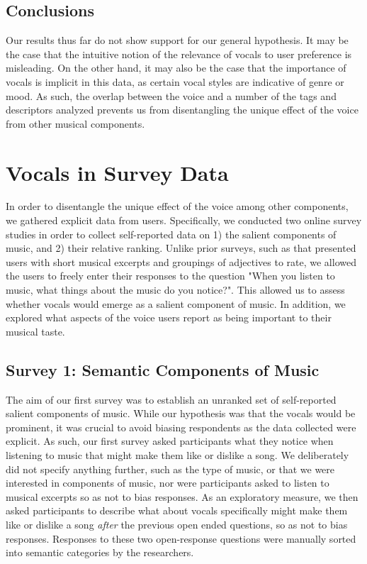 \documentclass{article}
\begin{document}
\subsection{Conclusions}

Our results thus far do not show support for our general hypothesis. It may be the case that the intuitive notion of the relevance of vocals to user preference is misleading. On the other hand, it may also be the case that the importance of vocals is implicit in this data, as certain vocal styles are indicative of genre or mood. As such, the overlap between the voice and a number of the tags and descriptors analyzed prevents us from disentangling the unique effect of the voice from other musical components.

\section{Vocals in Survey Data}

In order to disentangle the unique effect of the voice among other components, we gathered explicit data from users.
Specifically, we conducted two online survey studies in order to collect self-reported data on 1) the salient components of music, and 2) their relative ranking. Unlike prior surveys, such as \cite{lesaffre2008potential} that presented users with short musical excerpts and groupings of adjectives to rate, we allowed the users to freely enter their responses to the question "When you listen to music, what things about the music do you notice?". This allowed us to assess whether vocals would emerge as a salient component of music. In addition, we explored what aspects of the voice users report as being important to their musical taste.

\subsection{Survey 1: Semantic Components of Music}

The aim of our first survey was to establish an unranked set of self-reported salient components of music.
While our hypothesis was that the vocals would be prominent, it was crucial to avoid biasing respondents as the data collected were explicit.
As such, our first survey asked participants what they notice when listening to music that might make them like or dislike a song. We deliberately did not specify anything further, such as the type of music, or that we were interested in components of music, nor were participants asked to listen to musical excerpts so as not to bias responses.
As an exploratory measure, we then asked participants to describe what about vocals specifically might make them like or dislike a song \textit{after} the previous open ended questions, so as not to bias responses.
Responses to these two open-response questions were manually sorted into semantic categories by the researchers. %
\end{document}
